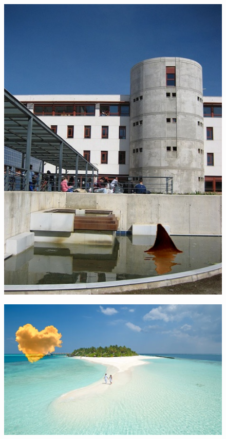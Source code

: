 \documentclass[oneside]{article}
\begin{document}
\begin{figure}[htbp]
\centering
\includegraphics[width=1\textwidth]{./img/mix_etsiit_aleta.jpg}
\caption{}
\label{fig:10}
\end{figure}

\begin{figure}[htbp]
\centering
\includegraphics[width=1\textwidth]{./img/mix_nubebn1mixed.jpg}
\caption{}
\label{fig:11}
\end{figure}

{}


\nocite{*}
\end{document}
